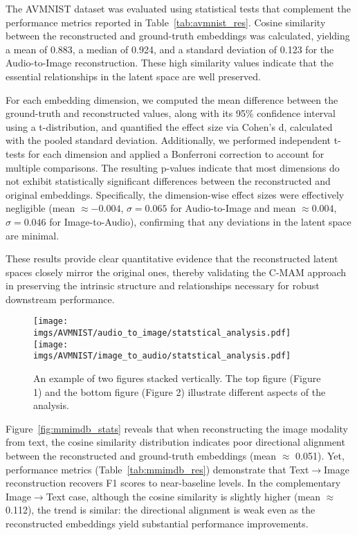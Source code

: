 The AVMNIST dataset was evaluated using statistical tests that complement the performance metrics reported in Table~\ref{tab:avmnist_res}. Cosine similarity between the reconstructed and ground-truth embeddings was calculated, yielding a mean of 0.883, a median of 0.924, and a standard deviation of 0.123 for the Audio-to-Image reconstruction. These high similarity values indicate that the essential relationships in the latent space are well preserved.

For each embedding dimension, we computed the mean difference between the ground-truth and reconstructed values, along with its 95\% confidence interval using a t-distribution, and quantified the effect size via Cohen’s d, calculated with the pooled standard deviation. Additionally, we performed independent t-tests for each dimension and applied a Bonferroni correction to account for multiple comparisons. The resulting p-values indicate that most dimensions do not exhibit statistically significant differences between the reconstructed and original embeddings. Specifically, the dimension-wise effect sizes were effectively negligible (mean $\approx -0.004$, $\sigma = 0.065$ for Audio-to-Image and mean $\approx 0.004$, $\sigma = 0.046$ for Image-to-Audio), confirming that any deviations in the latent space are minimal.

These results provide clear quantitative evidence that the reconstructed latent spaces closely mirror the original ones, thereby validating the C-MAM approach in preserving the intrinsic structure and relationships necessary for robust downstream performance.

\begin{figure}[ht!]
    \centering
    \texttt{[image: imgs/AVMNIST/audio\_to\_image/statstical\_analysis.pdf]}
    \texttt{[image: imgs/AVMNIST/image\_to\_audio/statstical\_analysis.pdf]}
    \caption{An example of two figures stacked vertically. The top figure (Figure 1) and the bottom figure (Figure 2) illustrate different aspects of the analysis.}
    \label{fig:avmnist_stats_figure}
\end{figure}

Figure~\ref{fig:mmimdb_stats} reveals that when reconstructing the image modality from text, the cosine similarity distribution indicates poor directional alignment between the reconstructed and ground-truth embeddings (mean $\approx$ 0.051). Yet, performance metrics (Table~\ref{tab:mmimdb_res}) demonstrate that Text$\rightarrow$Image reconstruction recovers F1 scores to near-baseline levels. In the complementary Image$\rightarrow$Text case, although the cosine similarity is slightly higher (mean $\approx$ 0.112), the trend is similar: the directional alignment is weak even as the reconstructed embeddings yield substantial performance improvements.

